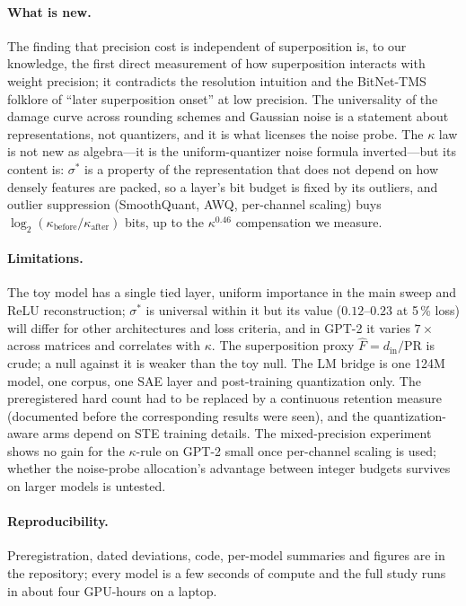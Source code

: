 \documentclass{article}
\begin{document}
\paragraph{What is new.} The finding that precision cost is independent of superposition is, to our knowledge, the first
direct measurement of how superposition interacts with weight precision; it contradicts the resolution intuition and the
BitNet-TMS folklore of ``later superposition onset'' at low precision. The universality of the damage curve across
rounding schemes and Gaussian noise is a statement about representations, not quantizers, and it is what licenses the
noise probe. The $\kappa$ law is not new as algebra---it is the uniform-quantizer noise formula inverted---but its
content is: $\sigma^*$ is a property of the representation that does not depend on how densely features are packed,
so a layer's bit budget is fixed by its outliers, and outlier suppression (SmoothQuant, AWQ, per-channel scaling) buys
$\log_2(\kappa_{\mathrm{before}}/\kappa_{\mathrm{after}})$ bits, up to the $\kappa^{0.46}$ compensation we measure.

\paragraph{Limitations.} The toy model has a single tied layer, uniform importance in the main sweep and ReLU
reconstruction; $\sigma^*$ is universal within it but its value ($0.12$--$0.23$ at 5\,\% loss) will differ for other
architectures and loss criteria, and in GPT-2 it varies $7\times$ across matrices and correlates with $\kappa$. The
superposition proxy $\hat F = d_{\mathrm{in}}/\mathrm{PR}$ is crude; a null against it is weaker than the toy null. The LM
bridge is one 124M model, one corpus, one SAE layer and post-training quantization only. The preregistered hard count had to be
replaced by a continuous retention measure (documented before the corresponding results were seen), and the
quantization-aware arms depend on STE training details. The mixed-precision experiment shows no gain for the
$\kappa$-rule on GPT-2 small once per-channel scaling is used; whether the noise-probe allocation's advantage between
integer budgets survives on larger models is untested.

\paragraph{Reproducibility.} Preregistration, dated deviations, code, per-model summaries and figures are in the
repository; every model is a few seconds of compute and the full study runs in about four GPU-hours on a laptop.
\end{document}

